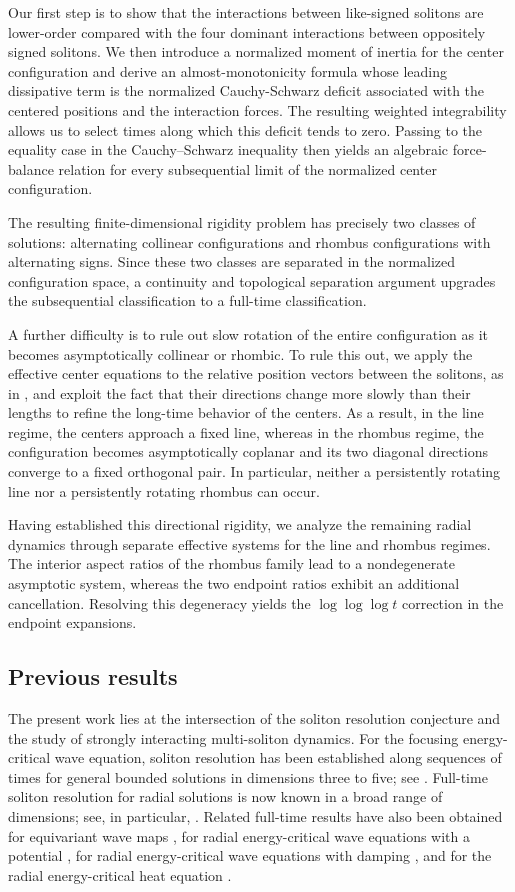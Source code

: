 \documentclass[10pt,a4paper]{amsart}
\numberwithin{equation}{section}
\begin{document}
Our first step is to show that the interactions between like-signed solitons are lower-order compared with the four dominant interactions between oppositely signed solitons. We then introduce a normalized moment of inertia for the center configuration and derive an almost-monotonicity formula whose leading dissipative term is the normalized Cauchy-Schwarz deficit associated with the centered positions and the interaction forces. The resulting weighted integrability allows us to select times along which this deficit tends to zero. Passing to the equality case in the Cauchy--Schwarz inequality then yields an algebraic force-balance relation for every subsequential limit of the normalized center configuration.

The resulting finite-dimensional rigidity problem has precisely two classes of solutions: alternating collinear configurations and rhombus configurations with alternating signs. Since these two classes are separated in the normalized configuration space, a continuity and topological separation argument upgrades the subsequential classification to a full-time classification.

A further difficulty is to rule out slow rotation of the entire configuration as it becomes asymptotically collinear or rhombic. To rule this out, we apply the effective center equations to the relative position vectors between the solitons, as in \cite{I3}, and exploit the fact that their directions change more slowly than their lengths to refine the long-time behavior of the centers. As a result, in the line regime, the centers approach a fixed line, whereas in the rhombus regime, the configuration becomes asymptotically coplanar and its two diagonal directions converge to a fixed orthogonal pair. In particular, neither a persistently rotating line nor a persistently rotating rhombus can occur.

Having established this directional rigidity, we analyze the remaining radial dynamics through separate effective systems for the line and rhombus regimes. The interior aspect ratios of the rhombus family lead to a nondegenerate asymptotic system, whereas the two endpoint ratios exhibit an additional cancellation. Resolving this degeneracy yields the $\log\log\log t$ correction in the endpoint expansions.


\subsection{Previous results}
The present work lies at the intersection of the soliton resolution conjecture and the study of strongly interacting multi-soliton dynamics. For the focusing energy-critical wave equation, soliton resolution has been established along sequences of times for general bounded solutions in dimensions three to five; see \cite{DJKM}. Full-time soliton resolution for radial solutions is now known in a broad range of dimensions; see, in particular, \cite{DKM2,CDKM,JL4}. Related full-time results have also been obtained for equivariant wave maps \cite{DKMM,JL3}, for radial energy-critical wave equations with a potential \cite{JLX,LMZ}, for radial energy-critical wave equations with damping \cite{GZ}, and for the radial energy-critical heat equation \cite{A1}.
\end{document}
